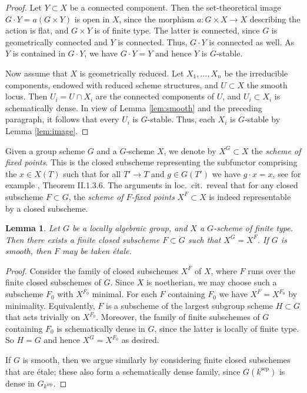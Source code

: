 \documentclass[oneside, 12pt]{amsart}
\newtheorem{lemma}[theorem]{Lemma}
\theoremstyle{definition}
\theoremstyle{remark}
\newcommand{\ra}{\rightarrow}
\newcommand{\sep}{{\operatorname{sep}}}
\begin{document}
\begin{proof}
Let $Y\subset X$ be a connected component.
Then the set-theoretical image  $G \cdot Y = a(G \times Y)$
is open in $X$, since the   morphism $a:G\times X\ra X$ describing the action 
is flat,  and $G \times Y$ is
of finite type. The latter
is connected, since $G$ is geometrically
connected and $Y$ is connected. 
Thus, $G \cdot Y$ is connected as well.
As $Y$ is contained in $G \cdot Y$, we have 
$G \cdot Y = Y$ and hence $Y$ is $G$-stable.

Now assume that $X$ is geometrically reduced. Let   $X_1,\ldots,X_n$ be
the irreducible components, endowed with reduced scheme structures, and $U\subset X$ the smooth locus.
Then  $U_i=U\cap X_i$ are the connected components of $U$,
and $U_i\subset X_i$ is schematically dense.
In view of Lemma \ref{lem:smooth} and the preceding paragraph, it follows that every $U_i$ is 
$G$-stable. Thus, each $X_i$ is $G$-stable 
by Lemma \ref{lem:image}.
\end{proof}

Given a group scheme $G$ and a $G$-scheme $X$,
we denote by $X^G\subset X$ the \emph{scheme of fixed points}.
This is the closed subscheme  representing 
the subfunctor comprising the $x\in X(T)$
such that for all $T'\ra T$ and $g\in G(T')$ we have
$g\cdot x=x$, see for example \cite{Demazure; Gabriel 1970},
Theorem II.1.3.6. The arguments in loc.\ cit.\ reveal that 
for any closed subscheme $F\subset G$, 
the \emph{scheme of $F$-fixed points} $X^F\subset X$ 
is indeed representable by a closed subscheme.



\begin{lemma}
\label{lem:fixed}
Let $G$ be a locally algebraic group, and $X$ 
a $G$-scheme of finite type. Then there exists 
a finite closed subscheme $F\subset G$ such that 
$X^G = X^F$. If $G$ is smooth,  then $F$ may 
be taken \'etale.
\end{lemma}


\begin{proof}
Consider the family of closed subschemes
$X^F$ of $X$, where $F$ runs over the finite closed
subschemes of $G$. Since $X$ is noetherian, we may choose such a
subscheme $F_0$ with $X^{F_0}$ minimal.
For each $F$ containing $F_0$ we have 
$X^F = X^{F_0}$ by minimality.
Equivalently, $F$ is a subscheme of the 
largest subgroup scheme $H \subset G$
that acts trivially on $X^{F_0}$. 
Moreover, the family of finite subschemes of $G$
containing $F_0$ is schematically dense in $G$, 
since the latter is locally of finite type. 
So $H = G$ and hence $X^G = X^{F_0}$ as desired.

If $G$ is smooth, then we argue similarly 
by considering finite closed subschemes that are \'etale; these 
also form a schematically dense family, since
$G(k^{\sep})$ is dense in $G_{k^{\sep}}$.
\end{proof}
\end{document}
